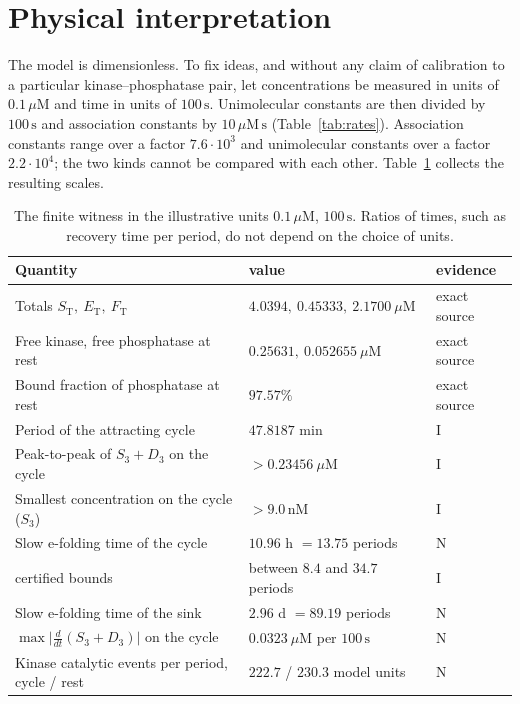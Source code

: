 \documentclass[11pt,a4paper]{article}
\theoremstyle{plain}
\theoremstyle{definition}
\theoremstyle{remark}
\newcommand{\ET}{E_{\mathrm T}}
\newcommand{\FT}{F_{\mathrm T}}
\newcommand{\ST}{S_{\mathrm T}}
\newcommand{\abs}[1]{\lvert#1\rvert}
\newcommand{\evI}{\textsf{I}}
\newcommand{\evN}{\textsf{N}}
\begin{document}
\section{Physical interpretation}\label{sec:physical}
The model is dimensionless. To fix ideas, and without any claim of calibration to a particular kinase--phosphatase pair, let concentrations be measured in units of $0.1\,\mu\mathrm M$ and time in units of $100\,\mathrm s$. Unimolecular constants are then divided by $100\,\mathrm s$ and association constants by $10\,\mu\mathrm M\,\mathrm s$ (Table~\ref{tab:rates}). Association constants range over a factor $7.6\cdot10^{3}$ and unimolecular constants over a factor $2.2\cdot10^{4}$; the two kinds cannot be compared with each other. Table~\ref{tab:physical} collects the resulting scales.

\begin{table}[t]
\centering\small
\begin{tabular}{lll}
\toprule
Quantity & value & evidence\\
\midrule
Totals $\ST,\ \ET,\ \FT$ & $4.0394,\ 0.45333,\ 2.1700\ \mu\mathrm M$ & exact source\\
Free kinase, free phosphatase at rest & $0.25631,\ 0.052655\ \mu\mathrm M$ & exact source\\
Bound fraction of phosphatase at rest & $97.57\%$ & exact source\\
Period of the attracting cycle & $47.8187$ min & \evI\\
Peak-to-peak of $S_3+D_3$ on the cycle & $>0.23456\ \mu\mathrm M$ & \evI\\
Smallest concentration on the cycle ($S_3$) & $>9.0\,\mathrm{nM}$ & \evI\\
Slow e-folding time of the cycle & $10.96$ h $=13.75$ periods & \evN\\
\quad certified bounds & between $8.4$ and $34.7$ periods & \evI\\
Slow e-folding time of the sink & $2.96$ d $=89.19$ periods & \evN\\
$\max\abs{\tfrac d{dt}(S_3+D_3)}$ on the cycle & $0.0323\ \mu\mathrm M$ per $100\,\mathrm s$ & \evN\\
Kinase catalytic events per period, cycle / rest & $222.7$ / $230.3$ model units & \evN\\
\bottomrule
\end{tabular}
\caption{The finite witness in the illustrative units $0.1\,\mu\mathrm M$, $100\,\mathrm s$. Ratios of times, such as recovery time per period, do not depend on the choice of units.}
\label{tab:physical}
\end{table}
\end{document}
